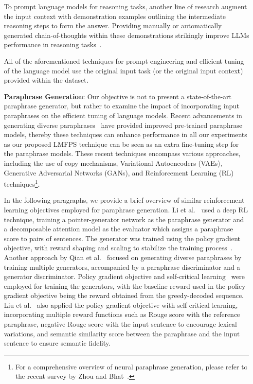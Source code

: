 \documentclass[11pt]{article}
\begin{document}
To prompt language models for reasoning tasks, another line of research augment the input context with demonstration examples outlining the intermediate reasoning steps to form the answer. Providing manually or automatically generated chain-of-thoughts within these demonstrations strikingly improve LLMs performance in reasoning tasks~\cite{DBLP:journals/corr/abs-2201-11903, zhang2022automatic, NEURIPS2022_8bb0d291}.

All of the aforementioned techniques for prompt engineering and efficient tuning of the language model use the original input task (or the original input context) provided within the dataset.

\noindent
{\bf Paraphrase Generation}:
Our objective is not to present a state-of-the-art paraphrase generator, but rather to examine the impact of incorporating input paraphrases on the efficient tuning of language models. Recent advancements in generating diverse paraphrases~\cite{zhou-bhat-2021-paraphrase} have provided improved pre-trained paraphrase models, thereby these techniques can enhance performance in all our experiments as our proposed LMFPS technique can be seen as an extra fine-tuning step for the paraphrase models. These recent techniques encompass various approaches, including the use of copy mechanisms, Variational Autoencoders (VAEs), Generative Adversarial Networks (GANs), and Reinforcement Learning (RL) techniques\footnote{For a comprehensive overview of neural paraphrase generation, please refer to the recent survey by Zhou and Bhat~\cite{zhou-bhat-2021-paraphrase}.}.

In the following paragraphs, we provide a brief overview of similar reinforcement learning objectives employed for paraphrase generation. Li et al.~\cite{li-etal-2018-paraphrase} used a deep RL technique, training a pointer-generator network as the paraphrase generator and a decomposable attention model as the evaluator which assigns a paraphrase score to pairs of sentences. The generator was trained using the policy gradient objective, with reward shaping and scaling to stabilize the training process~\cite{li-etal-2018-paraphrase}. Another approach by Qian et al.~\cite{qian-etal-2019-exploring} focused on generating diverse paraphrases by training multiple generators, accompanied by a paraphrase discriminator and a generator discriminator. Policy gradient objective and self-critical learning~\cite{DBLP:journals/corr/RennieMMRG16} were employed for training the generators, with the baseline reward used in the policy gradient objective being the reward obtained from the greedy-decoded sequence. Liu et al.~\cite{liu-etal-2020-learning} also applied the policy gradient objective with self-critical learning, incorporating multiple reward functions such as Rouge score with the reference paraphrase, negative Rouge score with the input sentence to encourage lexical variations, and semantic similarity score between the paraphrase and the input sentence to ensure semantic fidelity.
\end{document}
